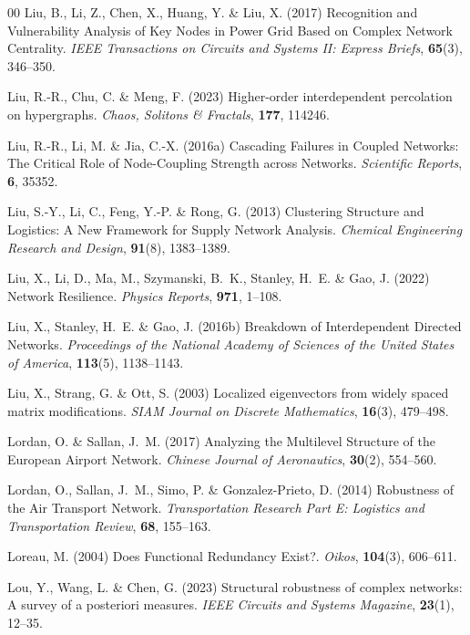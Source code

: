 \documentclass{comnet-mod}
\begin{document}
\begin{thebibliography}{00}
Liu, B., Li, Z., Chen, X., Huang, Y. {\&} Liu, X. (2017)  {Recognition and
  Vulnerability Analysis of Key Nodes in Power Grid Based on Complex Network
  Centrality}. {\em {IEEE Transactions on Circuits and Systems II: Express
  Briefs}}, \textbf{65}(3), 346--350.

Liu, R.-R., Chu, C. {\&} Meng, F. (2023)  Higher-order interdependent
  percolation on hypergraphs. {\em {Chaos, Solitons \& Fractals}},
  \textbf{177}, 114246.

Liu, R.-R., Li, M. {\&} Jia, C.-X. (2016a)  {Cascading Failures in Coupled
  Networks: {{The}} Critical Role of Node-Coupling Strength across Networks}.
  {\em {Scientific Reports}}, \textbf{6}, 35352.

Liu, S.-Y., Li, C., Feng, Y.-P. {\&} Rong, G. (2013)  {Clustering Structure and
  Logistics: {{A}} New Framework for Supply Network Analysis}. {\em {Chemical
  Engineering Research and Design}}, \textbf{91}(8), 1383--1389.

Liu, X., Li, D., Ma, M., Szymanski, B.~K., Stanley, H.~E. {\&} Gao, J. (2022)
  {Network Resilience}. {\em {Physics Reports}}, \textbf{971}, 1--108.

Liu, X., Stanley, H.~E. {\&} Gao, J. (2016b)  {Breakdown of Interdependent
  Directed Networks}. {\em {Proceedings of the National Academy of Sciences of
  the United States of America}}, \textbf{113}(5), 1138--1143.

Liu, X., Strang, G. {\&} Ott, S. (2003)  Localized eigenvectors from widely
  spaced matrix modifications. {\em {SIAM Journal on Discrete Mathematics}},
  \textbf{16}(3), 479--498.

Lordan, O. {\&} Sallan, J.~M. (2017)  {Analyzing the Multilevel Structure of
  the {{European}} Airport Network}. {\em {Chinese Journal of Aeronautics}},
  \textbf{30}(2), 554--560.

Lordan, O., Sallan, J.~M., Simo, P. {\&} {Gonzalez-Prieto}, D. (2014)
  {Robustness of the Air Transport Network}. {\em {Transportation Research Part
  E: Logistics and Transportation Review}}, \textbf{68}, 155--163.

Loreau, M. (2004)  {Does Functional Redundancy Exist?}. {\em {Oikos}},
  \textbf{104}(3), 606--611.

Lou, Y., Wang, L. {\&} Chen, G. (2023)  {Structural robustness of complex
  networks: A survey of a posteriori measures}. {\em {IEEE Circuits and Systems
  Magazine}}, \textbf{23}(1), 12--35.


\end{thebibliography}
\end{document}

